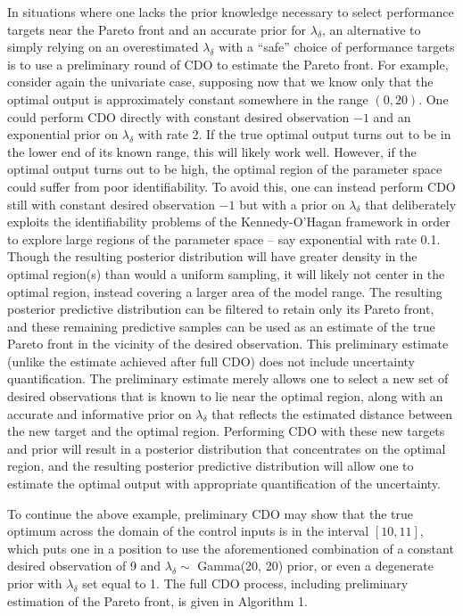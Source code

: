 \documentclass[12pt]{article}
\begin{document}
%
In situations where one lacks the prior knowledge necessary to select performance targets near the Pareto front and an accurate prior for $\lambda_\delta$, an alternative to simply relying on an overestimated $\lambda_\delta$ with a ``safe'' choice of performance targets is to use a preliminary round of CDO to estimate the Pareto front.
%
For example, consider again the univariate case, supposing now that we know only that the optimal output is approximately constant somewhere in the range $(0,20)$. 
%
One could perform CDO directly with constant desired observation $-1$ and an exponential prior on $\lambda_\delta$ with rate 2.
%
If the true optimal output turns out to be in the lower end of its known range, this will likely work well.
%
However, if the optimal output turns out to be high, the optimal region of the parameter space could suffer from poor identifiability.
%
To avoid this, one can instead perform CDO still with constant desired observation $-1$ but with a prior on $\lambda_\delta$ that deliberately exploits the identifiability problems of the Kennedy-O'Hagan framework in order to explore large regions of the parameter space -- say exponential with rate 0.1.
% 
Though the resulting posterior distribution will have greater density in the optimal region(s) than would a uniform sampling, it will likely not center in the optimal region, instead covering a larger area of the model range.
%
The resulting posterior predictive distribution can be filtered to retain only its Pareto front, and these remaining predictive samples can be used as an estimate of the true Pareto front in the vicinity of the desired observation.
%
This preliminary estimate (unlike the estimate achieved after full CDO) does not include uncertainty quantification. 
%
The preliminary estimate merely allows one to select a new set of desired observations that is known to lie near the optimal region, along with an accurate and informative prior on $\lambda_\delta$ that reflects the estimated distance between the new target and the optimal region.
%
Performing CDO with these new targets and prior will result in a posterior distribution that concentrates on the optimal region, and the resulting posterior predictive distribution will allow one to estimate the optimal output with appropriate quantification of the uncertainty.
%

To continue the above example, preliminary CDO may show that the true optimum across the domain of the control inputs is in the interval $[10,11]$, which puts one in a position to use the aforementioned combination of a constant desired observation of 9 and $\lambda_\delta\sim$ Gamma(20, 20) prior, or even a degenerate prior with $\lambda_\delta$ set equal to 1.
%
The full CDO process, including preliminary estimation of the Pareto front, is given in Algorithm 1.
\end{document}
